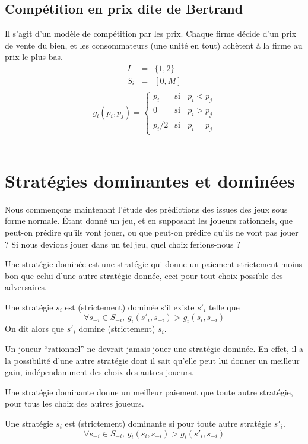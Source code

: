 \subsection{Compétition en prix dite de Bertrand}
Il s'agit d'un modèle de compétition par les prix. Chaque firme
décide d'un prix de vente du bien, et les consommateurs (une unité
en tout) achètent à la firme au prix le plus bas.
\begin{eqnarray*}
I   &=& \{1,2\}\\
S_i &=& [0,M] \\
\end{eqnarray*}
$$
g_i(p_i,p_j)=\begin{cases}
  p_i &\mbox{si }\;\; p_i < p_j\\
  0 &\mbox{si }\;\; p_i > p_j\\
  p_i/2 &\mbox{si }\;\; p_i = p_j
\end{cases}$$\\

\section{Stratégies dominantes et dominées}
Nous commençons maintenant l'étude des prédictions des issues des
jeux sous forme normale. Étant donné un jeu, et en supposant les
joueurs rationnels, que peut-on prédire qu'ils vont jouer, ou que
peut-on prédire qu'ils ne vont pas jouer ? Si nous devions jouer
dans un tel jeu, quel choix ferions-nous ?

Une stratégie dominée est une stratégie qui donne un paiement
strictement moins bon que celui d'une autre stratégie donnée, ceci
pour tout choix possible des adversaires.

\begin{definition}
Une stratégie $s_i$ est (strictement) dominée s'il existe $s'_i$
telle que
$$
\forall s_{-i}\in S_{-i},\, g_i(s'_i,s_{-i}) > g_i(s_i,s_{-i})
$$
On dit alors que $s'_i$ domine (strictement) $s_i$.
\end{definition}

Un joueur ``rationnel'' ne devrait jamais jouer une stratégie
dominée. En effet, il a la possibilité d'une autre stratégie dont
il sait qu'elle peut lui donner un meilleur gain, indépendamment
des choix des autres joueurs.

Une stratégie dominante donne un meilleur paiement que toute autre
stratégie, pour tous les choix des autres joueurs.

\begin{definition}
Une stratégie $s_i$ est (strictement) dominante si pour toute
autre stratégie $s'_i$.
$$
\forall s_{-i}\in S_{-i},\, g_i(s_i,s_{-i}) > g_i(s'_i,s_{-i})
$$
\end{definition}

